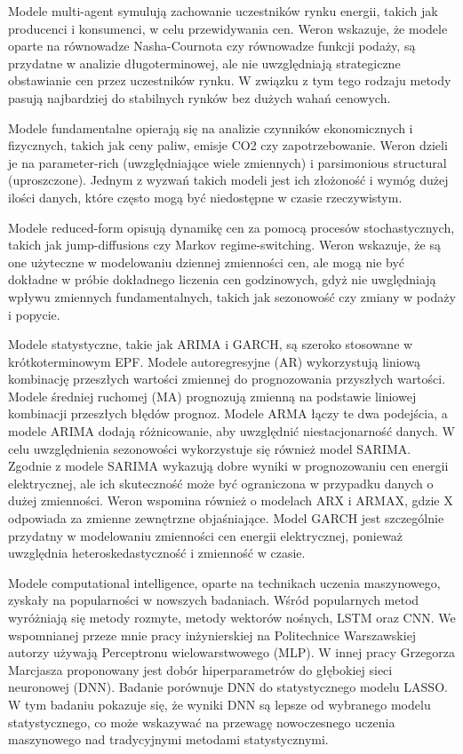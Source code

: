 Modele multi-agent symulują zachowanie uczestników rynku energii, takich jak producenci i konsumenci, w celu przewidywania cen. Weron \cite{WERON20141030} wskazuje, że modele oparte na równowadze Nasha-Cournota czy równowadze funkcji podaży, są przydatne w analizie długoterminowej, ale nie uwzględniają strategiczne obstawianie cen przez uczestników rynku. W związku z tym tego rodzaju metody pasują najbardziej do stabilnych rynków bez dużych wahań cenowych. 

Modele fundamentalne opierają się na analizie czynników ekonomicznych i fizycznych, takich jak ceny paliw, emisje CO2 czy zapotrzebowanie. Weron \cite{WERON20141030} dzieli je na parameter-rich (uwzględniające wiele zmiennych) i parsimonious structural (uproszczone). Jednym z wyzwań takich modeli jest ich złożoność i wymóg dużej ilości danych, które często mogą być niedostępne w czasie rzeczywistym. 

Modele reduced-form opisują dynamikę cen za pomocą procesów stochastycznych, takich jak jump-diffusions czy Markov regime-switching. Weron \cite{WERON20141030} wskazuje, że są one użyteczne w modelowaniu dziennej zmienności cen, ale mogą nie być dokładne w próbie dokładnego liczenia cen godzinowych, gdyż nie uwględniają wpływu zmiennych fundamentalnych, takich jak sezonowość czy zmiany w podaży i popycie.

Modele statystyczne, takie jak ARIMA i GARCH, są szeroko stosowane w krótkoterminowym EPF. Modele autoregresyjne (AR) wykorzystują liniową kombinację przeszłych wartości zmiennej do prognozowania przyszłych wartości. Modele średniej ruchomej (MA) prognozują zmienną na podstawie liniowej kombinacji przeszłych błędów prognoz. Modele ARMA łączy te dwa podejścia, a modele ARIMA dodają różnicowanie, aby uwzględnić niestacjonarność danych. W celu uwzględnienia sezonowości wykorzystuje się również model SARIMA. Zgodnie z \cite{appliedmath3020018} modele SARIMA wykazują dobre wyniki w prognozowaniu cen energii elektrycznej, ale ich skuteczność może być ograniczona w przypadku danych o dużej zmienności. Weron \cite{WERON20141030} wspomina również o modelach ARX i ARMAX, gdzie X odpowiada za zmienne zewnętrzne objaśniające. Model GARCH jest szczególnie przydatny w modelowaniu zmienności cen energii elektrycznej, ponieważ uwzględnia heteroskedastyczność i zmienność w czasie.

Modele computational intelligence, oparte na technikach uczenia maszynowego, zyskały na popularności w nowszych badaniach. Wśród popularnych metod wyróżniają się metody rozmyte, metody wektorów nośnych, LSTM oraz CNN. We wspomnianej przeze mnie pracy inżynierskiej na Politechnice Warszawskiej \cite{MGR2025} autorzy używają Perceptronu wielowarstwowego (MLP). W innej pracy Grzegorza Marcjasza \cite{en13184605} proponowany jest dobór hiperparametrów do głębokiej sieci neuronowej (DNN). Badanie porównuje DNN do statystycznego modelu LASSO. W tym badaniu pokazuje się, że wyniki DNN są lepsze od wybranego modelu statystycznego, co może wskazywać na przewagę nowoczesnego uczenia maszynowego nad tradycyjnymi metodami statystycznymi.

